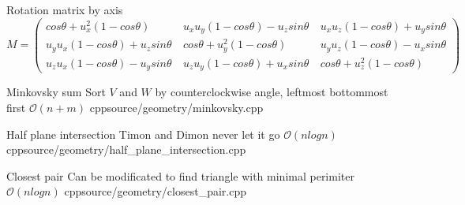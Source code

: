 \documentclass[landscape, 10pt, a4paper, oneside, twocolumn]{extarticle}
\begin{document}
\Formula
{Rotation matrix by axis}
{ $ M = 
	\left ( 
		\begin{smallmatrix} 
			cos\theta + u_{x}^{2} (1 - cos\theta) \  & u_{x} u_{y} (1 - cos\theta) - u_{z} sin\theta \ & u_{x} u_{z} (1 - cos\theta) + u_{y} sin\theta \\ 
			u_{y} u_{x} (1 - cos\theta) + u_{z} sin\theta \ & cos\theta + u_{y}^{2} (1 - cos\theta) \ & u_{y} u_{z} (1 - cos\theta) - u_{x} sin\theta \\ 
			u_{z} u_{x} (1 - cos\theta) - u_{y} sin\theta \ & u_{z} u_{y} (1 - cos\theta) + u_{x} sin\theta \ & cos\theta + u_{z}^{2} (1 - cos\theta)
		\end{smallmatrix} 
	\right ) $
}

\Algorithm
{Minkovsky sum}
{Sort $V$ and $W$ by counterclockwise angle, leftmost bottommost first}
{$\mathcal{O}(n + m)$}
{cpp}{source/geometry/minkovsky.cpp}

\Algorithm
{Half plane intersection}
{Timon and Dimon never let it go}
{$\mathcal{O}(n logn)$}
{cpp}{source/geometry/half_plane_intersection.cpp}

\Algorithm
{Closest pair}
{Can be modificated to find triangle with minimal perimiter}
{$\mathcal{O}(n logn)$}
{cpp}{source/geometry/closest_pair.cpp}
\end{document}
